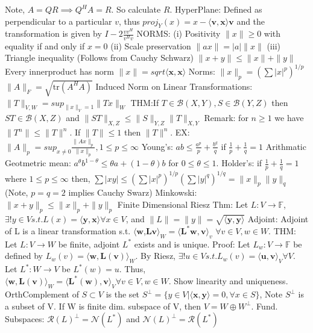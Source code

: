 \documentclass[8pt]{extarticle}
\theoremstyle{definition}
\begin{document}
{Note, $A=QR \implies Q^HA=R$. So calculate $R$.
HyperPlane: Defined as perpendicular to a particular $v$, thus $proj_Y(x) = x - \langle \mathbf{v}, \mathbf{x} \rangle \mathbf{v}$ and the transformation is given by $I - 2 \frac{vv^H}{v^Hv}$
NORMS: (i) Positivity $\|x\| \geq 0$ with equality if and only if $x=0$
(ii) Scale preservation $\|ax\| = |a| \|x\|$
(iii) Triangle inequality (Follows from Cauchy Schwarz) $\|x+y\| \leq \|x\|+\|y\|$ Every innerproduct has norm $\|x\| = sqrt{\langle \mathbf{x}, \mathbf{x} \rangle }$
Norms: $\|x\|_p = (\sum |x|^p)^{1/p}$  $\|A\|_F = \sqrt{\text{tr}(A^HA)}$
Induced Norm on Linear Transformations: $\|T\|_{V,W} = sup_{\|x\|_V=1} \|Tx\|_W$
THM:If $T \in \mathscr{B}(X,Y), S\in \mathscr{B}(Y,Z)$ then $ ST \in \mathscr{B}(X,Z)$ and $ \|ST\|_{X,Z} \leq \|S\|_{Y,Z}\|T\|_{X,Y}$
Remark: for $n \geq 1$ we have $\|T^n\| \leq \|T\|^n$. If $\|T\| \leq 1$ then $\|T\|^n$.
EX: $\|A\|_p = sup_{x \neq 0} \frac{\|Ax\|_p}{\|x\|_p}, 1 \leq p \leq \infty$
Young's: $ab \leq \frac{a^p}{p} + \frac{b^q}{q}$ if $\frac{1}{p}+ \frac{1}{q} = 1$
Arithmatic Geotmetric mean: $a^\theta b^{1-\theta} \leq \theta a +(1-\theta)b$ for $0\leq \theta \leq 1$.
Holder's: if $\frac{1}{p} + \frac{1}{q} = 1$ where $1\leq p \leq \infty$ then, $\sum |xy| \leq (\sum|x|^p)^{1/p}(\sum|y|^q)^{1/q} = \|x\|_p\|y\|_q$
(Note, $p=q=2$ implies Cauchy Swarz)
Minkowski: $\|x+y\|_p \leq \|x\|_p + \|y\|_p$
Finite Dimensional Riesz Thm: Let $L:V \rightarrow \mathbb{F}$, $\exists! y \in V s.t. L(x) = \langle \mathbf{y}, \mathbf{x} \rangle \forall x \in V$, and $\|L\| = \|y\| = \sqrt{\langle \mathbf{y}, \mathbf{y} \rangle}$
Adjoint: Adjoint of L is a linear transformation s.t. $\langle \mathbf{w}$,$ \mathbf{Lv} \rangle_W = \langle \mathbf{L^*w}, \mathbf{v} \rangle _v$ $ \forall v \in V, w \in W$. 
THM: Let $L:V\rightarrow W$ be finite, adjoint $L^*$ exists and is unique.
Proof: Let $L_w:V\rightarrow \mathbb{F}$ be defined by $L_w(v) = \langle \mathbf{w}, \mathbf{L(v)} \rangle _W$. By Riesz, $\exists! u \in V s.t. L_w(v) = \langle \mathbf{u}, \mathbf{v} \rangle_V \forall V$. Let $L^*:W \rightarrow V$ be $L^*(w) = u$. Thus, $\langle \mathbf{w}, \mathbf{L(v)} \rangle_W = \langle \mathbf{L^*(w)}, \mathbf{v} \rangle_V \forall v \in V, w \in W$. Show linearity and uniqueness.
OrthComplement of $ S \subset V$ is the set $S^\bot = \{y \in V|\langle \mathbf{x}, \mathbf{y} \rangle = 0, \forall x \in S\}$, 
Note $S^\bot$ is a subset of V. If W is finite dim. subspace of V, then $V = W \oplus W^\bot$. 
Fund. Subspaces: $\mathscr{R}(L)^\bot = \mathscr{N}(L^*)$ and $\mathscr{N}(L)^\bot = \mathscr{R}(L^*)$
}
\end{document}
